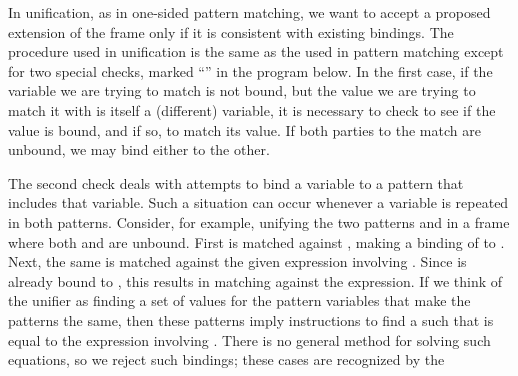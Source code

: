 \noindent
In unification, as in one-sided pattern matching, we want to accept a proposed
extension of the frame only if it is consistent with existing bindings.  The
procedure  used in unification is the same as the
 used in pattern matching except for two special
checks, marked ``\code{***}'' in the program below.  In the first case, if the
variable we are trying to match is not bound, but the value we are trying to
match it with is itself a (different) variable, it is necessary to check to see
if the value is bound, and if so, to match its value.  If both parties to the
match are unbound, we may bind either to the other.

The second check deals with attempts to bind a variable to a pattern that
includes that variable.  Such a situation can occur whenever a variable is
repeated in both patterns.  Consider, for example, unifying the two patterns
 and  in a
frame where both  and  are unbound.  First  is
matched against , making a binding of  to .  Next,
the same  is matched against the given expression involving .
Since  is already bound to , this results in matching
 against the expression.  If we think of the unifier as finding a set
of values for the pattern variables that make the patterns the same, then these
patterns imply instructions to find a  such that  is equal to
the expression involving .  There is no general method for solving
such equations, so we reject such bindings; these cases are recognized by the

